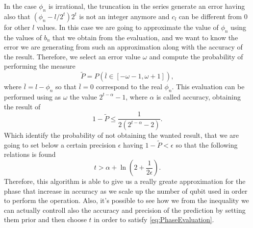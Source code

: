 {    In the case $\phi_n$ is irrational, the truncation in the series generate an error having also that $(\phi_n - l/2^t)2^t$ is not an integer anymore and $c_l$ can be different from $0$ for other $l$ values. In this case we are going to approximate the value of $\phi_n$ using the values of $b_n$ that we obtain from the evaluation, and we want to know the error we are generating from such an approximation along with the accuracy of the result. Therefore, we select an error value $\omega$ and compute the probability of performing the measure 
    \begin{equation}
        \tilde{P} = P(\overline{l} \in [-\omega-1, \omega+1]),
    \end{equation}
    where $\overline{l} = l - \phi_n$ so that $\overline{l} = 0$ correspond to the real $\phi_n$. This evaluation can be performed using as $\omega$ the value $2^{t - \alpha} - 1$, where $\alpha$ is called accuracy, obtaining the result of
    \begin{equation}
        1 - \tilde{P} \le \frac{1}{2(2^{t-\alpha} - 2)}.
    \end{equation}
    Which identify the probability of not obtaining the wanted result, that we are going to set below a certain precision $\epsilon$ having $1 - \tilde{P}<\epsilon$ so that the following relations is found
    \begin{equation}
        t > \alpha + \ln\left( 2 + \frac{1}{2\epsilon} \right).
    \end{equation}
}
\noindent
Therefore, this algorithm is able to give us a really greate approximation for the phase that increase in accuracy as we scale up the number of qubit used in order to perform the operation. Also, it's possible to see how we from the inequality we can actually controll also the accuracy and precision of the prediction by setting them prior and then choose $t$ in order to satisfy \eqref{eq:PhaseEvaluation}.